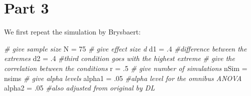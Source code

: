 \documentclass[
]{book}
\newenvironment{Shaded}{\begin{snugshade}}{\end{snugshade}}
\newcommand{\CommentTok}[1]{\textcolor[rgb]{0.56,0.35,0.01}{\textit{#1}}}
\newcommand{\DecValTok}[1]{\textcolor[rgb]{0.00,0.00,0.81}{#1}}
\newcommand{\FloatTok}[1]{\textcolor[rgb]{0.00,0.00,0.81}{#1}}
\newcommand{\NormalTok}[1]{#1}
\newcommand{\StringTok}[1]{\textcolor[rgb]{0.31,0.60,0.02}{#1}}
\begin{document}
\newpage

\hypertarget{part-3}{%
\section{Part 3}\label{part-3}}

We first repeat the simulation by Brysbaert:

\begin{Shaded}
\begin{Highlighting}[]
\CommentTok{# give sample size}
\NormalTok{N =}\StringTok{ }\DecValTok{75}
\CommentTok{# give effect size d}
\NormalTok{d1 =}\StringTok{ }\FloatTok{.4} \CommentTok{#difference between the extremes}
\NormalTok{d2 =}\StringTok{ }\FloatTok{.4} \CommentTok{#third condition goes with the highest extreme}
\CommentTok{# give the correlation between the conditions}
\NormalTok{r =}\StringTok{ }\FloatTok{.5}
\CommentTok{# give number of simulations}
\NormalTok{nSim =}\StringTok{ }\NormalTok{nsims}
\CommentTok{# give alpha levels}
\NormalTok{alpha1 =}\StringTok{ }\FloatTok{.05} \CommentTok{#alpha level for the omnibus ANOVA}
\NormalTok{alpha2 =}\StringTok{ }\FloatTok{.05} \CommentTok{#also adjusted from original by DL}
\end{Highlighting}
\end{Shaded}
\end{document}

